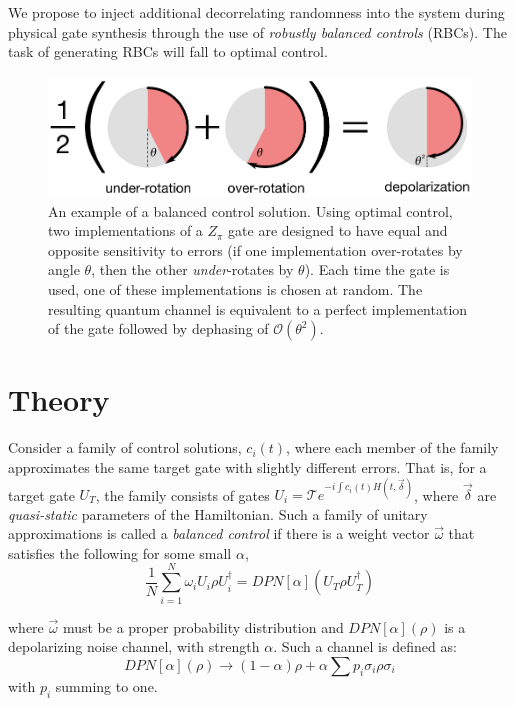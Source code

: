 \documentclass[aps,nofootinbib,pra,notitlepage,twocolumn]{revtex4-1}
\newcommand{\order}[1]{\mathcal{O}\left( #1 \right)}
\begin{document}
We propose to inject additional decorrelating randomness into the system during physical gate synthesis through the use of \emph{robustly balanced controls} (RBCs). The task of generating RBCs will fall to optimal control.
 
\begin{figure}
  \centering
  \includegraphics[width=\columnwidth]{simple_example.pdf}
  \caption{An example of a balanced control solution. Using optimal control, two implementations of a $Z_\pi$ gate are designed to have equal and opposite sensitivity to errors (if one implementation over-rotates by angle $\theta$, then the other \emph{under}-rotates by $\theta$). Each time the gate is used, one of these implementations is chosen at random. The resulting quantum channel is equivalent to a perfect implementation of the gate followed by dephasing of $\order{\theta^2}$.}
  \label{fig:simple_example}
\end{figure}

\section{Theory}
 Consider a family of control solutions, $c_i(t)$, where each member of the family approximates the same target gate with slightly different errors. That is, for a target gate $U_T$, the family consists of gates $U_i = \mathcal{T}e^{-i\int c_i(t)H(t, \vec{\delta})}$, where $\vec{\delta}$ are \textit{quasi-static}\cite{Ball2016} parameters of the Hamiltonian. Such a family of unitary approximations is called a \emph{balanced control} if there is a weight vector $\vec{\omega}$ that satisfies the following for some small $\alpha$,
\begin{equation}\label{eq:1}
  \frac{1}{N}\sum_{i=1}^N \omega_i U_i \rho U_i^\dagger = DPN[\alpha]\left(U_T \rho U_T^\dagger \right)
\end{equation}

where $\vec{\omega}$ must be a proper probability distribution and $DPN[\alpha](\rho)$ is a depolarizing noise channel, with strength $\alpha$. Such a channel is defined as:
\begin{equation}\label{eq:2}
  DPN[\alpha](\rho) \rightarrow (1-\alpha)\rho + \alpha\sum p_i \sigma_i\rho\sigma_i
\end{equation}
with $p_i$ summing to one. 
\end{document}
